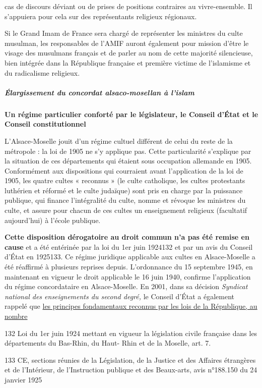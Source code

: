cas de discours déviant ou de prises de positions contraires au
vivre-ensemble. Il s'appuiera pour cela sur des représentants religieux
régionaux.

Si le Grand Imam de France sera chargé de représenter les ministres du
culte musulman, les responsables de l'AMIF auront également pour mission
d'être le visage des musulmans français et de parler au nom de cette
majorité silencieuse, bien intégrée dans la République française et
première victime de l'islamisme et du radicalisme religieux.


\hypertarget{uxe9largissement-du-concordat-alsaco-mosellan-uxe0-lislam}{%
\subparagraph{Élargissement du concordat alsaco-mosellan à
l'islam}\label{uxe9largissement-du-concordat-alsaco-mosellan-uxe0-lislam}}


\textbf{Un régime particulier conforté par le législateur, le Conseil
d'État et le Conseil constitutionnel}

L'Alsace-Moselle jouit d'un régime cultuel différent de celui du reste
de la métropole : la loi de 1905 ne s'y applique pas. Cette
particularité s'explique par la situation de ces départements qui
étaient sous occupation allemande en 1905. Conformément aux dispositions
qui courraient avant l'application de la loi de 1905, les quatre cultes
« reconnus » (le culte catholique, les cultes protestants luthérien et
réformé et le culte judaïque) sont pris en charge par la puissance
publique, qui finance l'intégralité du culte, nomme et révoque les
ministres du culte, et assure pour chacun de ces cultes un enseignement
religieux (facultatif aujourd'hui) à l'école publique.

\textbf{Cette disposition dérogatoire au droit commun n'a pas été remise
en cause} et a été entérinée par la loi du 1er juin 1924132 et par un
avis du Conseil d'État en 1925133. Ce régime juridique applicable aux
cultes en Alsace-Moselle a été réaffirmé à plusieurs reprises depuis.
L'ordonnance du 15 septembre 1945, en maintenant en vigueur le droit
applicable le 16 juin 1940, confirme l'application du régime
concordataire en Alsace-Moselle. En 2001, dans sa décision
\emph{Syndicat national des enseignements du second degré,} le Conseil
d'État a également rappelé que \underline{les principes fondamentaux
reconnus par les lois de la République, au nombre}

132 Loi du 1er juin 1924 mettant en vigueur la législation civile
française dans les départements du Bas-Rhin, du Haut- Rhin et de la
Moselle, art. 7.

133 CE, sections réunies de la Législation, de la Justice et des
Affaires étrangères et de l'Intérieur, de l'Instruction publique et des
Beaux-arts, avis n°188.150 du 24 janvier 1925

